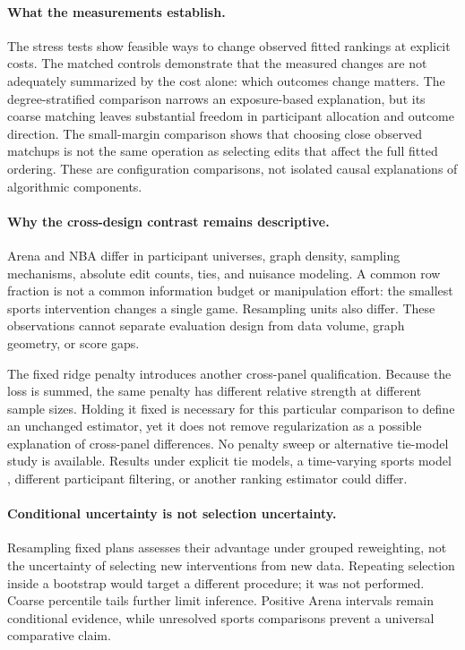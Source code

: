 \documentclass{article}
\begin{document}
\paragraph{What the measurements establish.}
The stress tests show feasible ways to change observed fitted rankings at explicit costs. The matched controls demonstrate that the measured changes are not adequately summarized by the cost alone: which outcomes change matters. The degree-stratified comparison narrows an exposure-based explanation, but its coarse matching leaves substantial freedom in participant allocation and outcome direction. The small-margin comparison shows that choosing close observed matchups is not the same operation as selecting edits that affect the full fitted ordering. These are configuration comparisons, not isolated causal explanations of algorithmic components.

\paragraph{Why the cross-design contrast remains descriptive.}
Arena and NBA differ in participant universes, graph density, sampling mechanisms, absolute edit counts, ties, and nuisance modeling. A common row fraction is not a common information budget or manipulation effort: the smallest sports intervention changes a single game. Resampling units also differ. These observations cannot separate evaluation design from data volume, graph geometry, or score gaps.

The fixed ridge penalty introduces another cross-panel qualification. Because the loss is summed, the same penalty has different relative strength at different sample sizes. Holding it fixed is necessary for this particular comparison to define an unchanged estimator, yet it does not remove regularization as a possible explanation of cross-panel differences. No penalty sweep or alternative tie-model study is available. Results under explicit tie models, a time-varying sports model \citep{Glickman1999}, different participant filtering, or another ranking estimator could differ.

\paragraph{Conditional uncertainty is not selection uncertainty.}
Resampling fixed plans assesses their advantage under grouped reweighting, not the uncertainty of selecting new interventions from new data. Repeating selection inside a bootstrap would target a different procedure; it was not performed. Coarse percentile tails further limit inference. Positive Arena intervals remain conditional evidence, while unresolved sports comparisons prevent a universal comparative claim.
\end{document}
